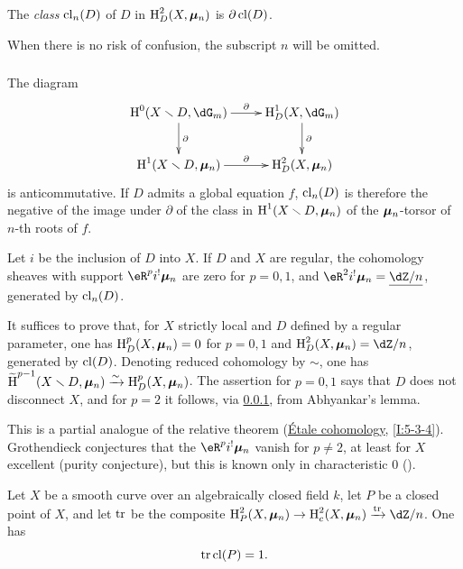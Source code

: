\begin{definition}\label{IV:2-1-2}
The \emph{class $\operatorname{cl}_n(D)$} of $D$ in $\operatorname{H}_D^2(X,{\bm\mu}_n)$ is
$\partial \operatorname{cl}(D)$.
\end{definition}

When there is no risk of confusion, the subscript $n$ will be omitted.






\subsubsection{}\label{IV:2-1-3}

The diagram
\[\xymatrix{
  \h^0(X\setminus D,\dG_m) \ar[r]^-\partial \ar[d]^-\partial
    & \h_D^1(X,\dG_m) \ar[d]^-\partial \\
  \h^1(X\setminus D,\dmu_n) \ar[r]^-\partial
    & \h_D^2(X,\dmu_n)
}\]
is anticommutative. If $D$ admits a global equation $f$, $\operatorname{cl}_n(D)$ is
therefore the negative of the image under $\partial$ of the class in
$\operatorname{H}^1(X\smallsetminus D,{\bm\mu}_n)$ of the ${\bm\mu}_n$-torsor of $n$-th roots of $f$.






\begin{proposition}\label{IV:2-1-4}
Let $i$ be the inclusion of $D$ into $X$. If $D$ and $X$ are regular, the
cohomology sheaves with support $\eR^p i^! \dmu_n$ are zero for $p=0,1$, and
$\eR^2 i^!\dmu_n = \underline{\dZ/n}$, generated by $\operatorname{cl}_n(D)$.
\end{proposition}

It suffices to prove that, for $X$ strictly local and $D$ defined by a regular
parameter, one has $\operatorname{H}_D^p(X,{\bm\mu}_n) = 0$ for $p=0,1$ and
$\h_D^2(X,\dmu_n) = \dZ/n$, generated by $\operatorname{cl}(D)$. Denoting reduced
cohomology by $\sim$, one has
$\widetilde{\operatorname{H}}^{p-1}(X\smallsetminus D,{\bm\mu}_n)\xrightarrow\sim \operatorname{H}_D^p(X,{\bm\mu}_n)$. The assertion
for $p=0,1$ says that $D$ does not disconnect $X$, and for $p=2$ it follows,
via \ref{IV:2-1-3}, from Abhyankar's lemma.

This is a partial analogue of the relative theorem
(\hyperref[I]{Étale cohomology}, \ref{I:5-3-4}). Grothendieck conjectures
that the $\eR^p i^! \dmu_n$ vanish for $p\ne 2$, at least for $X$ excellent
(purity conjecture), but this is known only in characteristic $0$
(\cite[XIX]{sga4}).






\begin{theorem}\label{IV:2-1-5}
Let $X$ be a smooth curve over an algebraically closed field $k$, let $P$ be a
closed point of $X$, and let $\operatorname{tr}$ be the composite
$\h_P^2(X,\dmu_n) \to \h_c^2(X,\dmu_n) \xrightarrow{\tr} \dZ/n$. One has
\[
  \operatorname{tr} \operatorname{cl}(P) = 1 \text{.}
\]
\end{theorem}

